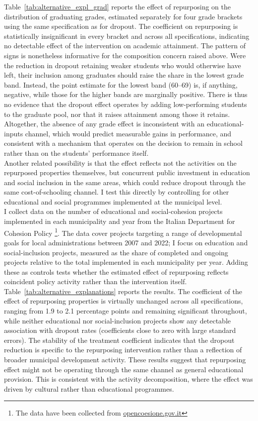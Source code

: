 \documentclass[12pt]{article}
\theoremstyle{plain}
\theoremstyle{plain}
\theoremstyle{plain}
\theoremstyle{definition}
\theoremstyle{plain}
\theoremstyle{definition}
\theoremstyle{plain}
\theoremstyle{remark}
\theoremstyle{definition}
\theoremstyle{definition}
\theoremstyle{plain}
\begin{document}
Table~\ref{tab:alternative_expl_grad} reports the effect of repurposing on the distribution of graduating grades, estimated separately for four grade brackets using the same specification as for dropout. The coefficient on repurposing is statistically insignificant in every bracket and across all specifications, indicating no detectable effect of the intervention on academic attainment. 
The pattern of signs is nonetheless informative for the composition concern raised above. Were the reduction in dropout retaining weaker students who would otherwise have left, their inclusion among graduates should raise the share in the lowest grade band. Instead, the point estimate for the lowest band (60–69) is, if anything, negative, while those for the higher bands are marginally positive. There is thus no evidence that the dropout effect operates by adding low-performing students to the graduate pool, nor that it raises attainment among those it retains. Altogether, the absence of any grade effect is inconsistent with an educational-inputs channel, which would predict measurable gains in performance, and consistent with a mechanism that operates on the decision to remain in school rather than on the students' performance itself. \\
Another related possibility is that the effect reflects not the activities on the repurposed properties themselves, but concurrent public investment in education and social inclusion in the same areas, which could reduce dropout through the same cost-of-schooling channel. I test this directly by controlling for other educational and social programmes implemented at the municipal level.\\
I collect data on the number of educational and social-cohesion projects implemented in each municipality and year from the Italian Department for Cohesion Policy \footnote{The data have been collected from \href{https://opencoesione.gov.it}{opencoesione.gov.it}}. The data cover projects targeting a range of developmental goals for local administrations between 2007 and 2022; I focus on education and social-inclusion projects, measured as the share of completed and ongoing projects relative to the total implemented in each municipality per year. Adding these as controls tests whether the estimated effect of repurposing reflects coincident policy activity rather than the intervention itself.
Table~\ref{tab:alternative_explanations} reports the results. The coefficient of the effect of repurposing properties is virtually unchanged across all specifications, ranging from 1.9 to 2.1 percentage points and remaining significant throughout, while neither educational nor social-inclusion projects show any detectable association with dropout rates (coefficients close to zero with large standard errors). The stability of the treatment coefficient indicates that the dropout reduction is specific to the repurposing intervention rather than a reflection of broader municipal development activity. These results suggest that repurposing effect might not be operating through the same channel as general educational provision. This is consistent with the activity decomposition, where the effect was driven by cultural rather than educational programmes.
\end{document}
